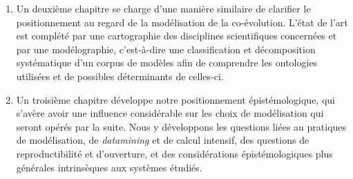 {\begin{enumerate}
	\item Un deuxième chapitre se charge d'une manière similaire de clarifier le positionnement au regard de la modélisation de la co-évolution. L'état de l'art est complété par une cartographie des disciplines scientifiques concernées et par une modélographie, c'est-à-dire une classification et décomposition systématique d'un corpus de modèles afin de comprendre les ontologies utilisées et de possibles déterminants de celles-ci.
	\item Un troisième chapitre développe notre positionnement épistémologique, qui s'avère avoir une influence considérable sur les choix de modélisation qui seront opérés par la suite. Nous y développons les questions liées au pratiques de modélisation, de \emph{datamining} et de calcul intensif, des questions de reproductibilité et d'ouverture, et des considérations épistémologiques plus générales intrinsèques aux systèmes étudiés. 
\end{enumerate}
}


